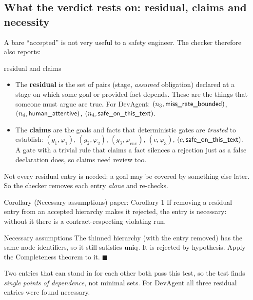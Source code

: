 \subsection{What the verdict rests on: residual, claims and necessity}
\label{sec:necessary}

A bare ``accepted'' is not very useful to a safety engineer. The checker therefore also reports:

\begin{defbox}{residual and claims}
\begin{itemize}
\item The \textbf{residual} is the set of pairs (stage, \emph{assumed} obligation) declared at a stage on which some goal or provided fact depends. These are the things that someone must argue are true. For DevAgent: $(n_3,\textsf{miss\_rate\_bounded})$, $(n_4,\textsf{human\_attentive})$, $(n_4,\textsf{safe\_on\_this\_text})$.
\item The \textbf{claims} are the goals and facts that deterministic gates are \emph{trusted} to establish: $(g_1,\varphi_1)$, $(g_2,\varphi_2)$, $(g_3,\varphi_{\mathrm{env}})$, $(c,\varphi_3)$, $(c,\textsf{safe\_on\_this\_text})$. A gate with a trivial rule that claims a fact silences a rejection just as a false declaration does, so claims need review too.
\end{itemize}
\end{defbox}

Not every residual entry is needed: a goal may be covered by something else later. So the checker removes each entry \emph{alone} and re-checks.

\begin{statement}{Corollary (Necessary assumptions) \hfill\normalfont paper: Corollary 1}
If removing a residual entry from an accepted hierarchy makes it rejected, the entry is necessary: without it there is a contract-respecting violating run.
\end{statement}

\begin{plainproof}{Necessary assumptions}
The thinned hierarchy (with the entry removed) has the same node identifiers, so it still satisfies $\mathrm{uniq}$. It is rejected by hypothesis. Apply the Completeness theorem to it. \hfill$\blacksquare$
\end{plainproof}

Two entries that can stand in for each other both pass this test, so the test finds \emph{single points of dependence}, not minimal sets. For DevAgent all three residual entries were found necessary.

